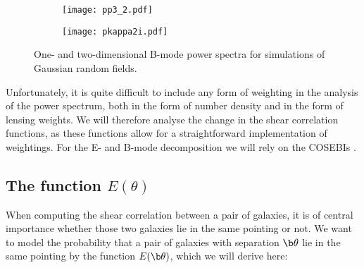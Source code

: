 \begin{figure}
\begin{subfigure}[c]{0.49\textwidth}
\texttt{[image: pp3\_2.pdf]}
\end{subfigure}
\begin{subfigure}[c]{0.49\textwidth}
\texttt{[image: pkappa2i.pdf]}
\end{subfigure}
\caption[B-mode power spectra in Gaussian random fields]{One- and two-dimensional B-mode power spectra for simulations of Gaussian random fields.}
\label{fig:powerspectra}
\end{figure}

Unfortunately, it is quite difficult to include any form of weighting in the analysis of the power spectrum, both in the form of number density and in the form of lensing weights. We will therefore analyse the change in the shear correlation functions, as these functions allow for a straightforward implementation of weightings. For the E- and B-mode decomposition we will rely on the COSEBIs \citep{2010A&A...520A.116S}.
\subsection{The function $E(\theta)$}
\label{sec:model_e}
When computing the shear correlation between a pair of galaxies, it is of central importance whether those two galaxies lie in the same pointing or not. We want to model the probability that a pair of galaxies with separation $\b\theta$ lie in the same pointing by the function $E(\b\theta)$, which we will derive here:

